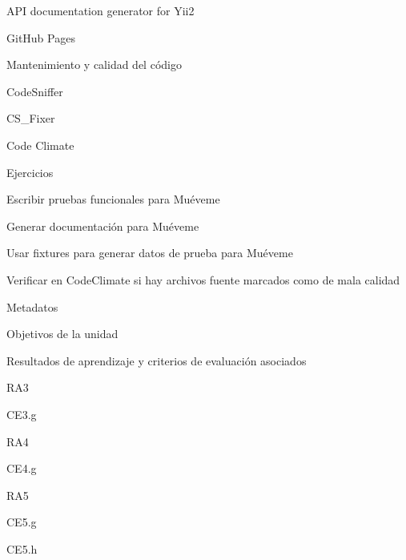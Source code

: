 \begin{longenum}
\begin{longenum}
\begin{longenum}
            \item API documentation generator for Yii2
            \item GitHub Pages
        \end{longenum}
        \item Mantenimiento y calidad del código
        \begin{longenum}
            \item CodeSniffer
            \item CS\_Fixer
            \item Code Climate
        \end{longenum}
        \item Ejercicios
        \begin{longenum}
            \item Escribir pruebas funcionales para Muéveme
            \item Generar documentación para Muéveme
            \item Usar fixtures para generar datos de prueba para Muéveme
            \item Verificar en CodeClimate si hay archivos fuente marcados como de mala calidad
        \end{longenum}
        \item Metadatos
        \begin{longenum}
            \item Objetivos de la unidad
            \item Resultados de aprendizaje y criterios de evaluación asociados
            \begin{longenum}
                \item RA3
                \begin{longenum}
                    \item CE3.g
                \end{longenum}
                \item RA4
                \begin{longenum}
                    \item CE4.g
                \end{longenum}
                \item RA5
                \begin{longenum}
                    \item CE5.g
                    \item CE5.h
                \end{longenum}

\end{longenum}
\end{longenum}
\end{longenum}
\end{longenum}
